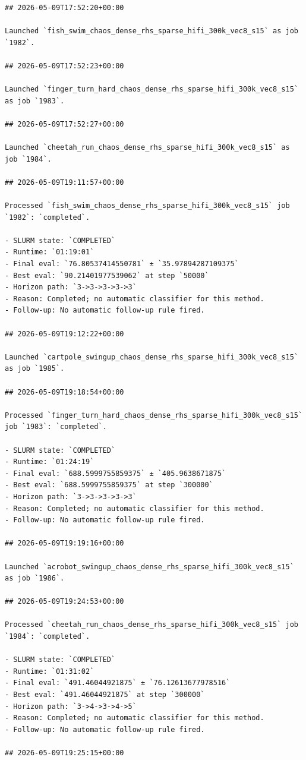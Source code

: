 \begin{verbatim}
## 2026-05-09T17:52:20+00:00

Launched `fish_swim_chaos_dense_rhs_sparse_hifi_300k_vec8_s15` as job `1982`.

## 2026-05-09T17:52:23+00:00

Launched `finger_turn_hard_chaos_dense_rhs_sparse_hifi_300k_vec8_s15` as job `1983`.

## 2026-05-09T17:52:27+00:00

Launched `cheetah_run_chaos_dense_rhs_sparse_hifi_300k_vec8_s15` as job `1984`.

## 2026-05-09T19:11:57+00:00

Processed `fish_swim_chaos_dense_rhs_sparse_hifi_300k_vec8_s15` job `1982`: `completed`.

- SLURM state: `COMPLETED`
- Runtime: `01:19:01`
- Final eval: `76.80537414550781` ± `35.97894287109375`
- Best eval: `90.21401977539062` at step `50000`
- Horizon path: `3->3->3->3->3`
- Reason: Completed; no automatic classifier for this method.
- Follow-up: No automatic follow-up rule fired.

## 2026-05-09T19:12:22+00:00

Launched `cartpole_swingup_chaos_dense_rhs_sparse_hifi_300k_vec8_s15` as job `1985`.

## 2026-05-09T19:18:54+00:00

Processed `finger_turn_hard_chaos_dense_rhs_sparse_hifi_300k_vec8_s15` job `1983`: `completed`.

- SLURM state: `COMPLETED`
- Runtime: `01:24:19`
- Final eval: `688.5999755859375` ± `405.9638671875`
- Best eval: `688.5999755859375` at step `300000`
- Horizon path: `3->3->3->3->3`
- Reason: Completed; no automatic classifier for this method.
- Follow-up: No automatic follow-up rule fired.

## 2026-05-09T19:19:16+00:00

Launched `acrobot_swingup_chaos_dense_rhs_sparse_hifi_300k_vec8_s15` as job `1986`.

## 2026-05-09T19:24:53+00:00

Processed `cheetah_run_chaos_dense_rhs_sparse_hifi_300k_vec8_s15` job `1984`: `completed`.

- SLURM state: `COMPLETED`
- Runtime: `01:31:02`
- Final eval: `491.46044921875` ± `76.12613677978516`
- Best eval: `491.46044921875` at step `300000`
- Horizon path: `3->4->3->4->5`
- Reason: Completed; no automatic classifier for this method.
- Follow-up: No automatic follow-up rule fired.

## 2026-05-09T19:25:15+00:00


\end{verbatim}
